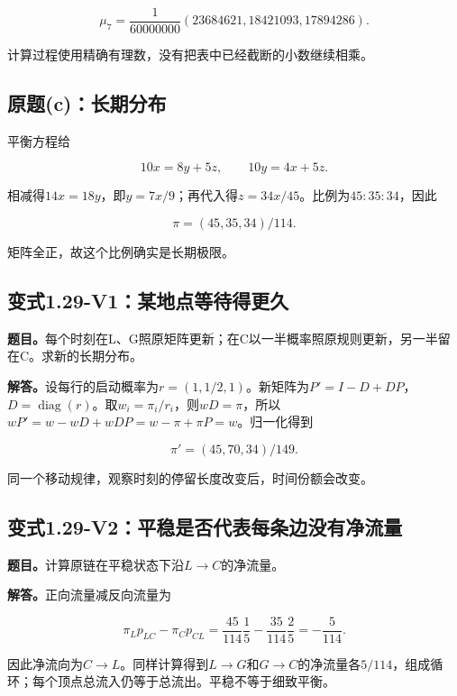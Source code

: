 \documentclass[
  11pt,
  a4paper,
  UTF8,
  fontset=fandol]{ctexart}
\begin{document}
\[
\boxed{\mu_7=\frac1{60000000}(23684621,18421093,17894286).}
\]

计算过程使用精确有理数，没有把表中已经截断的小数继续相乘。

\subsection{原题(c)：长期分布}\label{ux539fux9898cux957fux671fux5206ux5e03}

平衡方程给

\[
10x=8y+5z,\qquad 10y=4x+5z.
\]

相减得\(14x=18y\)，即\(y=7x/9\)；再代入得\(z=34x/45\)。比例为\(45:35:34\)，因此

\[
\boxed{\pi=(45,35,34)/114.}
\]

矩阵全正，故这个比例确实是长期极限。

\subsection{变式1.29-V1：某地点等待得更久}\label{ux53d8ux5f0f1.29-v1ux67d0ux5730ux70b9ux7b49ux5f85ux5f97ux66f4ux4e45}

\textbf{题目。}每个时刻在L、G照原矩阵更新；在C以一半概率照原规则更新，另一半留在C。求新的长期分布。

\textbf{解答。}设每行的启动概率为\(r=(1,1/2,1)\)。新矩阵为\(P'=I-D+DP\)，\(D=\operatorname{diag}(r)\)。取\(w_i=\pi_i/r_i\)，则\(wD=\pi\)，所以\(wP'=w-wD+wDP=w-\pi+\pi P=w\)。归一化得到

\[
\boxed{\pi'=(45,70,34)/149.}
\]

同一个移动规律，观察时刻的停留长度改变后，时间份额会改变。

\subsection{变式1.29-V2：平稳是否代表每条边没有净流量}\label{ux53d8ux5f0f1.29-v2ux5e73ux7a33ux662fux5426ux4ee3ux8868ux6bcfux6761ux8fb9ux6ca1ux6709ux51c0ux6d41ux91cf}

\textbf{题目。}计算原链在平稳状态下沿\(L\to C\)的净流量。

\textbf{解答。}正向流量减反向流量为

\[
\pi_Lp_{LC}-\pi_Cp_{CL}
=\frac{45}{114}\frac15-\frac{35}{114}\frac25
=\boxed{-\frac5{114}}.
\]

因此净流向为\(C\to L\)。同样计算得到\(L\to G\)和\(G\to C\)的净流量各\(5/114\)，组成循环；每个顶点总流入仍等于总流出。平稳不等于细致平衡。
\end{document}
